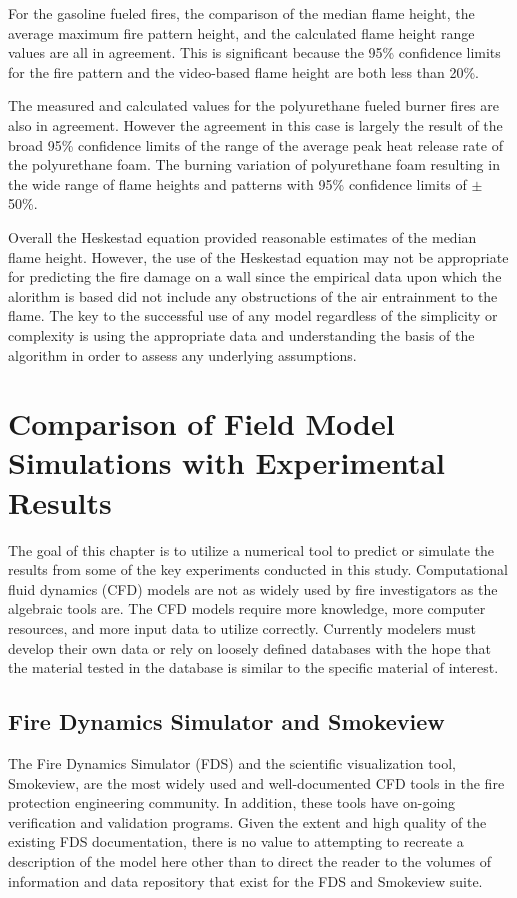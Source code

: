 \documentclass[twoside]{uocthesis}
\begin{document}
{For the gasoline fueled fires, the comparison of the median flame height, the average maximum fire pattern height, and the calculated flame height range values are all in agreement. This is significant because the 95\% confidence limits for the fire pattern and the video-based flame height are both less than 20\%.

The measured and calculated values for the polyurethane fueled burner fires are also in agreement.  However the agreement in this case is largely the result of the broad 95\% confidence limits of the range of the average peak heat release rate of the polyurethane foam.  The burning variation of polyurethane foam resulting in the wide range of flame heights and patterns with 95\% confidence limits of $\pm$ 50\%. 

Overall the Heskestad equation provided reasonable estimates of the median flame height.  However, the use of the Heskestad equation may not be appropriate for predicting the fire damage on a wall since the empirical data upon which the alorithm is based did not include any obstructions of the air entrainment to the flame. The key to the successful use of any model regardless of the simplicity or complexity is using the appropriate data and understanding the basis of the algorithm in order to assess any underlying assumptions.  

\chapter{Comparison of Field Model Simulations with Experimental Results}

The goal of this chapter is to utilize a numerical tool to predict or simulate the results from some of the key experiments conducted in this study.  Computational fluid dynamics (CFD) models are not as widely used by fire investigators as the algebraic tools are.  The CFD models require more knowledge, more computer resources, and more input data to utilize correctly.  Currently modelers must develop their own data or rely on loosely defined databases with the hope that the material tested in the database is similar to the specific material of interest.       

\section{Fire Dynamics Simulator and Smokeview}

The Fire Dynamics Simulator (FDS) and the scientific visualization tool, Smokeview, are the most widely used and well-documented CFD tools in the fire protection engineering community. In addition, these tools have on-going verification and validation programs.  Given the extent and high quality of the existing FDS documentation, there is no value to attempting to recreate a description of the model here other than to direct the reader to the volumes of information and data repository that exist for the FDS and Smokeview suite.

}
\end{document}
